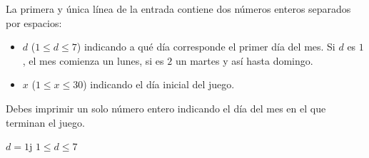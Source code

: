 \documentclass{oci}
\begin{document}
\begin{inputDescription}
  La primera y única línea de la entrada contiene dos números enteros separados por espacios:
  \begin{itemize}
    \item $d$ ($1 \leq d \leq 7$) indicando a qué día corresponde el primer día del mes. Si $d$ es $1$, el mes comienza un lunes, si es $2$ un martes y así hasta domingo.
    \item $x$ ($1 \leq x \leq 30$) indicando el día inicial del juego.
  \end{itemize}
\end{inputDescription}

\begin{outputDescription}
  Debes imprimir un solo número entero indicando el día del mes en el que terminan el juego.
\end{outputDescription}

\begin{scoreDescription}
  $d = 1$j
  $1 \leq d \leq 7$
\end{scoreDescription}

\begin{sampleDescription}
\end{sampleDescription}
\end{document}
